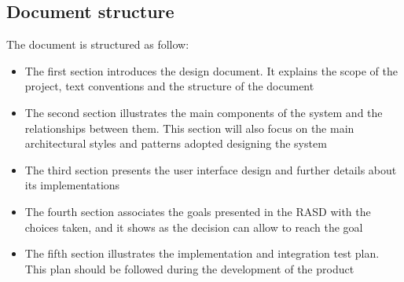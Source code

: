 \subsection{Document structure}
The document is structured as follow:
\begin{itemize}
\item The first section introduces the design document. 
It explains the scope of the project, text conventions and the structure of the document
\item The second section illustrates the main components of the system and the relationships between them.
This section will also focus on the main architectural styles and patterns adopted designing the system
\item The third section presents the user interface design and further details about its implementations
\item The fourth section associates the goals presented in the RASD with the choices taken, and it shows as the decision can allow to reach the
goal
\item The fifth section illustrates the implementation and integration test plan. This plan should be followed during the development of the 
product
\end{itemize}